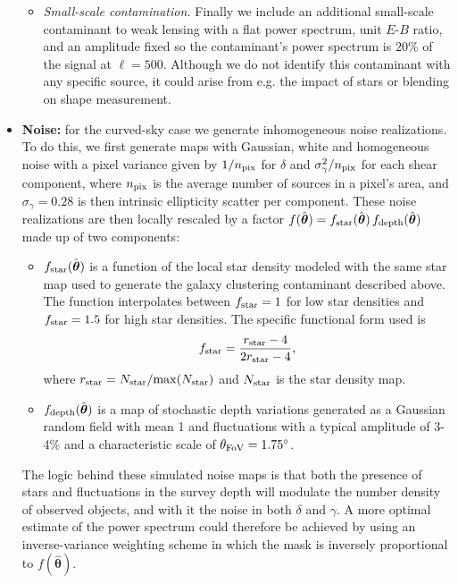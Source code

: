 \documentclass[usenatbib]{mnrasb}
\newcommand{\nv}{\hat{\boldsymbol{\theta}}}
\begin{document}
\begin{itemize}
\begin{itemize}
            \item {\sl Small-scale contamination.} Finally we include an additional small-scale contaminant to weak lensing with a flat power spectrum, unit $E$-$B$ ratio, and an amplitude fixed so the contaminant's power spectrum is $20\%$ of the signal at $\ell=500$. Although we do not identify this contaminant with any specific source, it could arise from e.g. the impact of stars or blending on shape measurement.
          \end{itemize}
          \item {\bf Noise:} for the curved-sky case we generate inhomogeneous noise realizations. To do this, we first generate maps with Gaussian, white and homogeneous noise with a pixel variance given by $1/n_{\rm pix}$ for $\delta$ and $\sigma_\gamma^2/n_{\rm pix}$ for each shear component, where $n_{\rm pix}$ is the average number of sources in a pixel's area, and $\sigma_\gamma=0.28$ is then intrinsic ellipticity scatter per component. These noise realizations are then locally rescaled by a factor $f(\nv)=f_{\rm star}(\nv)\,f_{\rm depth}(\nv)$ made up of two components:
          \begin{itemize}
            \item $f_{\rm star}(\nv)$ is a function of the local star density modeled with the same star map used to generate the galaxy clustering contaminant described above. The function interpolates between $f_{\rm star}=1$ for low star densities and $f_{\rm star}=1.5$ for high star densities. The specific functional form used is
            \begin{equation}
              f_{\rm star}=\frac{r_{\rm star}-4}{2r_{\rm star}-4},
            \end{equation}
            where $r_{\rm star}=N_{\rm star}/{\rm max}(N_{\rm star})$ and $N_{\rm star}$ is the star density map.
            \item $f_{\rm depth}(\nv)$ is a map of stochastic depth variations generated as a Gaussian random field with mean 1 and fluctuations with a typical amplitude of 3-4\% and a characteristic scale of $\theta_{\rm FoV}=1.75^\circ$.
          \end{itemize}
          The logic behind these simulated noise maps is that both the presence of stars and fluctuations in the survey depth will modulate the number density of observed objects, and with it the noise in both $\delta$ and $\gamma$. A more optimal estimate of the power spectrum could therefore be achieved by using an inverse-variance weighting scheme in which the mask is inversely proportional to $f(\nv)$.
          

\end{itemize}
\end{document}
